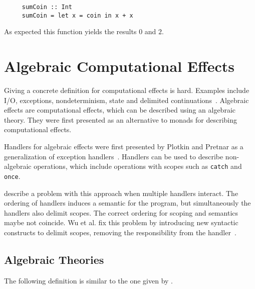 \begin{verbatim}
     sumCoin :: Int
     sumCoin = let x = coin in x + x
\end{verbatim}
As expected this function yields the results $0$ and $2$.


\section{Algebraic Computational Effects}

Giving a concrete definition for computational effects is hard.
Examples include I/O, exceptions, nondeterminism, state and delimited
continuations~\cite{DBLP:journals/corr/abs-1807-05923}.
Algebraic effects are computational effects, which can be described using an
algebraic theory.
They were first presented \textcite{DBLP:conf/fossacs/PlotkinP02} as an
alternative to monads for describing computational effects.

Handlers for algebraic effects were first presented by Plotkin and Pretnar
as a generalization of exception handlers~\cite{DBLP:conf/esop/PlotkinP09}.
Handlers can be used to describe non-algebraic operations, which include
operations with scopes such as \texttt{catch} and \texttt{once}.

\textcite{DBLP:conf/haskell/WuSH14} describe a problem with this approach when
multiple handlers interact.
The ordering of handlers induces a semantic for the program, but simultaneously
the handlers also delimit scopes.
The correct ordering for scoping and semantics maybe not coincide.
Wu et al. fix this problem by introducing new syntactic constructs to delimit
scopes, removing the responsibility from the
handler~\cite{DBLP:conf/haskell/WuSH14,DBLP:conf/lics/PirogSWJ18}.


\subsection{Algebraic Theories}

The following definition is similar to the one given by
\textcite{DBLP:journals/corr/abs-1807-05923}.

